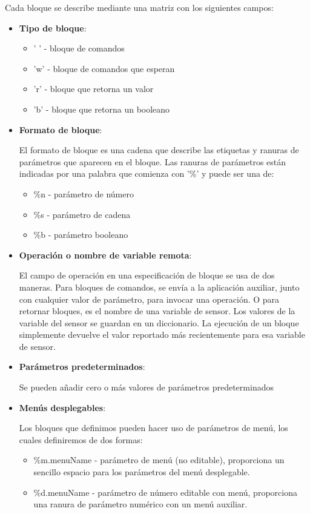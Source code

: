 Cada bloque se describe mediante una matriz con los siguientes campos:
\begin{itemize}
\item \textbf{Tipo de bloque}:

\begin{itemize}
\item ' ' - bloque de comandos
\item 'w' - bloque de comandos que esperan
\item 'r' - bloque que retorna un valor
\item 'b' - bloque que retorna un booleano 
\end{itemize}
\item \textbf{Formato de bloque}:

El formato de bloque es una cadena que describe las etiquetas y ranuras de parámetros que aparecen en el bloque.
Las ranuras de parámetros están indicadas por una palabra que comienza con '\%' y puede ser una de:
\begin{itemize}
\item \%n -  parámetro de número 
\item \%s - parámetro de cadena 
\item \%b - parámetro booleano
\end{itemize}
\item \textbf{Operación o nombre de variable remota}:

El campo de operación en una especificación de bloque se usa de dos maneras. Para bloques de comandos, se envía a la aplicación auxiliar, junto con cualquier valor de parámetro, para invocar una operación. O para retornar bloques, es el nombre de una variable de sensor. Los valores de la variable del sensor se guardan en un diccionario.
La ejecución de un bloque simplemente devuelve el valor reportado más recientemente para esa variable de sensor.
\item \textbf{Parámetros predeterminados}:

Se pueden añadir cero o más valores de parámetros predeterminados

\item \textbf{Menús desplegables}:

Los bloques que definimos pueden hacer uso de parámetros de menú, los cuales definiremos de dos formas:
\begin{itemize}
\item \%m.menuName - parámetro de menú (no editable), proporciona un sencillo espacio para los parámetros del menú desplegable.
\item \%d.menuName - parámetro de número editable con menú, proporciona una ranura de parámetro numérico con un menú auxiliar.
\end{itemize}
\end{itemize}

